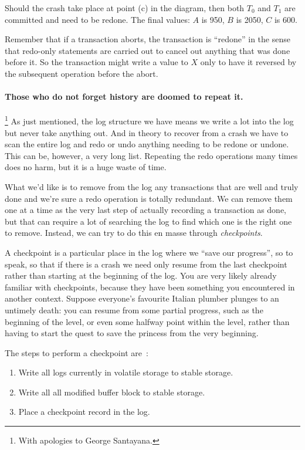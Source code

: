 Should the crash take place at point (c) in the diagram, then both $T_{0}$ and $T_{1}$ are committed and need to be redone. The final values: $A$ is 950, $B$ is 2050, $C$ is 600.

Remember that if a transaction aborts, the transaction is ``redone'' in the sense that redo-only statements are carried out to cancel out anything that was done before it. So the transaction might write a value to $X$ only to have it reversed by the subsequent operation before the abort.

\paragraph{Those who do not forget history are doomed to repeat it.}\footnote{With apologies to George Santayana.} As just mentioned, the log structure we have means we write a lot into the log but never take anything out. And in theory to recover from a crash we have to scan the entire log and redo or undo anything needing to be redone or undone. This can be, however, a very long list. Repeating the redo operations many times does no harm, but it is a huge waste of time.

What we'd like is to remove from the log any transactions that are well and truly done and we're sure a redo operation is totally redundant. We can remove them one at a time as the very last step of actually recording a transaction as done, but that can require a lot of searching the log to find which one is the right one to remove. Instead, we can try to do this en masse through \textit{checkpoints}.

A checkpoint is a particular place in the log where we ``save our progress'', so to speak, so that if there is a crash we need only resume from the last checkpoint rather than starting at the beginning of the log. You are very likely already familiar with checkpoints, because they have been something you encountered in another context. Suppose everyone's favourite Italian plumber plunges to an untimely death: you can resume from some partial progress, such as the beginning of the level, or even some halfway point within the level, rather than having to start the quest to save the princess from the very beginning. 

The steps to perform a checkpoint are~\cite{dsc}:

\begin{enumerate}
	\item Write all logs currently in volatile storage to stable storage.
	\item Write all all modified buffer block to stable storage.
	\item Place a checkpoint record in the log.
\end{enumerate}

